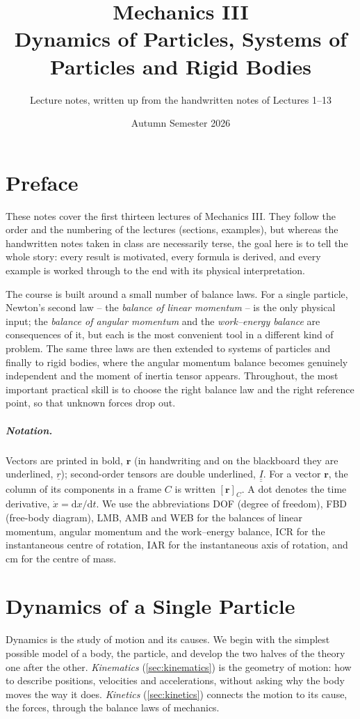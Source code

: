 \documentclass[11pt,a4paper,oneside]{report}
\title{\Huge\bfseries Mechanics III\\[0.6em]\Large\mdseries Dynamics of Particles, Systems of Particles and Rigid Bodies}
\author{Lecture notes, written up from the handwritten notes of Lectures 1--13}
\date{Autumn Semester 2026}
\numberwithin{equation}{chapter}
\newcommand{\vect}[1]{\bm{#1}}
\newcommand{\tens}[1]{\underline{\underline{#1}}}
\theoremstyle{plain}
\theoremstyle{definition}
\theoremstyle{remark}
\newcommand{\lecture}[2]{\marginpar{\raggedright\footnotesize\textsc{Lecture #1}\\\textit{#2}}}
\begin{document}
\maketitle

\chapter*{Preface}
These notes cover the first thirteen lectures of Mechanics III. They follow the order and the numbering of the
lectures (sections, examples), but whereas the handwritten notes taken in class are necessarily terse, the
goal here is to tell the whole story: every result is motivated, every formula is derived, and every example is
worked through to the end with its physical interpretation.

The course is built around a small number of balance laws. For a single particle, Newton's second law -- the
\emph{balance of linear momentum} -- is the only physical input; the \emph{balance of angular momentum} and
the \emph{work--energy balance} are consequences of it, but each is the most convenient tool in a different
kind of problem. The same three laws are then extended to systems of particles and finally to rigid bodies,
where the angular momentum balance becomes genuinely independent and the moment of inertia tensor appears.
Throughout, the most important practical skill is to choose the right balance law and the right reference
point, so that unknown forces drop out.

\paragraph{Notation.}
Vectors are printed in bold, $\vect r$ (in handwriting and on the blackboard they are underlined,
$\underline r$); second-order tensors are double underlined, $\tens I$. For a vector $\vect r$, the column of its
components in a frame $C$ is written $[\vect r]_C$. A dot denotes the time derivative, $\dot x=\mathrm dx/\mathrm dt$.
We use the abbreviations DOF (degree of freedom), FBD (free-body diagram), LMB, AMB and WEB for the balances of
linear momentum, angular momentum and the work--energy balance, ICR for the instantaneous centre of rotation, IAR
for the instantaneous axis of rotation, and cm for the centre of mass.

\tableofcontents

\chapter{Dynamics of a Single Particle}
\lecture{1}{16.09.2026}
Dynamics is the study of motion and its causes. We begin with the simplest possible model of a body, the
particle, and develop the two halves of the theory one after the other. \emph{Kinematics}
(\cref{sec:kinematics}) is the geometry of motion: how to describe positions, velocities and accelerations,
without asking why the body moves the way it does. \emph{Kinetics} (\cref{sec:kinetics}) connects the motion to
its cause, the forces, through the balance laws of mechanics.
\end{document}
